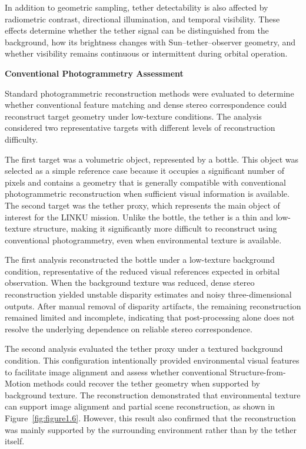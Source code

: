In addition to geometric sampling, tether detectability is also affected by radiometric contrast, directional illumination, and temporal visibility. These effects determine whether the tether signal can be distinguished from the background, how its brightness changes with Sun--tether--observer geometry, and whether visibility remains continuous or intermittent during orbital operation.

\vspace{0.3cm}
\noindent\textbf{Conventional Photogrammetry Assessment}

Standard photogrammetric reconstruction methods were evaluated to determine whether conventional feature matching and dense stereo correspondence could reconstruct target geometry under low-texture conditions. The analysis considered two representative targets with different levels of reconstruction difficulty.

The first target was a volumetric object, represented by a bottle. This object was selected as a simple reference case because it occupies a significant number of pixels and contains a geometry that is generally compatible with conventional photogrammetric reconstruction when sufficient visual information is available. The second target was the tether proxy, which represents the main object of interest for the LINKU mission. Unlike the bottle, the tether is a thin and low-texture structure, making it significantly more difficult to reconstruct using conventional photogrammetry, even when environmental texture is available.

The first analysis reconstructed the bottle under a low-texture background condition, representative of the reduced visual references expected in orbital observation. When the background texture was reduced, dense stereo reconstruction yielded unstable disparity estimates and noisy three-dimensional outputs. After manual removal of disparity artifacts, the remaining reconstruction remained limited and incomplete, indicating that post-processing alone does not resolve the underlying dependence on reliable stereo correspondence.

The second analysis evaluated the tether proxy under a textured background condition. This configuration intentionally provided environmental visual features to facilitate image alignment and assess whether conventional Structure-from-Motion methods could recover the tether geometry when supported by background texture. The reconstruction demonstrated that environmental texture can support image alignment and partial scene reconstruction, as shown in Figure~\ref{fig:figure1.6}. However, this result also confirmed that the reconstruction was mainly supported by the surrounding environment rather than by the tether itself.

